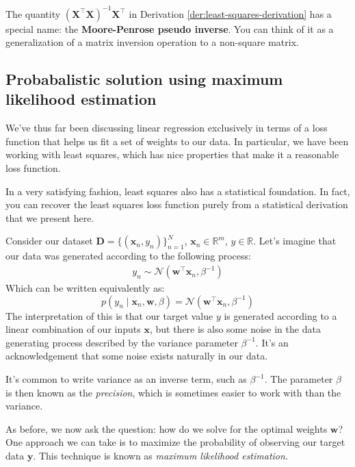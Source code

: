 The quantity $(\mathbf{X}^\top\mathbf{X})^{-1}\mathbf{X}^\top$ in Derivation \ref{der:least-squares-derivation} has a special name: the \textbf{Moore-Penrose pseudo inverse}. You can think of it as a generalization of a matrix inversion operation to a non-square matrix.

\subsection{Probabalistic solution using maximum likelihood estimation}
We've thus far been discussing linear regression exclusively in terms of a loss function that helps us fit a set of weights to our data. In particular, we have been working with least squares, which has nice properties that make it a reasonable loss function.

In a very satisfying fashion, least squares also has a statistical foundation. In fact, you can recover the least squares loss function purely from a statistical derivation that we present here.

Consider our dataset $\mathbf{D} = \{(\mathbf{x}_n, y_n)\}_{n = 1}^{N}$, $\mathbf{x}_n \in\mathbb{R}^m$, $y \in\mathbb{R}$. Let's imagine that our data was generated according to the following process:
\begin{align*}
    y_n \sim \mathcal{N}(\mathbf{w}^\top\mathbf{x}_n, \beta^{-1})
\end{align*}
Which can be written equivalently as:
\begin{equation}
    \label{eq:normal-over-w}
    p(y_n \mid \mathbf{x}_n, \mathbf{w}, \beta) = \mathcal{N}(\mathbf{w}^\top\mathbf{x}_n, \beta^{-1})
\end{equation}
The interpretation of this is that our target value $y$ is generated according to a linear combination of our inputs $\mathbf{x}$, but there is also some noise in the data generating process described by the variance parameter $\beta^{-1}$. It's an acknowledgement that some noise exists naturally in our data.

\begin{warning}
    It's common to write variance as an inverse term, such as $\beta^{-1}$. The parameter $\beta$ is then known as the \textit{precision}, which is sometimes easier to work with than the variance.
\end{warning}

As before, we now ask the question: how do we solve for the optimal weights $\mathbf{w}$? One approach we can take is to maximize the probability of observing our target data $\mathbf{y}$. This technique is known as \textit{maximum likelihood estimation}. \vskip 0.5in

